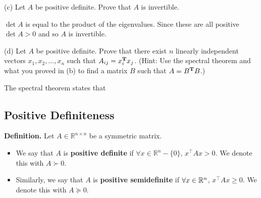 (c) Let $A$ be positive definite. Prove that $A$ is invertible.
\begin{mdframed}
  $\det A$ is equal to the product of the eigenvalues. Since these are all
  positive $\det A > 0$ and so $A$ is invertible.
\end{mdframed}

(d) Let $A$ be positive definite. Prove that there exist $n$ linearly independent
vectors $x_1,x_2,...,x_n$ such that $A_{ij} = x_i^{\mathbf{T}} x_j$. (Hint: Use the spectral theorem
and what you proved in (b) to find a matrix $B$ such that $A = B^{\mathbf{T}} B$.)
\begin{mdframed}
  The spectral theorem states that
\end{mdframed}
\newpage

\subsection{Positive Definiteness}
\textbf{Definition.} Let $A \in \mathbb{R}^{n \times n}$ be a symmetric matrix.
\begin{itemize}
    \item We say that $A$ is \textbf{positive definite} if $\forall x \in \mathbb{R}^n - \{0\}$, $x^{\top}Ax > 0$. We denote this with $A \succ 0$.
    \item Similarly, we say that $A$ is \textbf{positive semidefinite} if $\forall x \in \mathbb{R}^n$, $x^{\top}Ax \geq 0$. We denote this with $A \succeq 0$.
\end{itemize}
